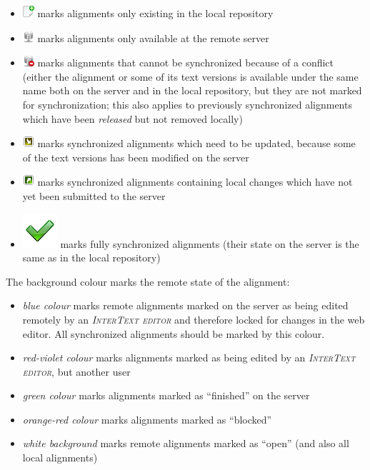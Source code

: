 \documentclass[a4paper,10pt,oneside]{book}
\newcommand{\ITeditor}{\textit{\textsc{InterText editor}}\xspace}
\begin{document}
\begin{itemize}
 \item \includegraphics[height=1.5ex]{../images/16/local.png} marks alignments only existing in the local repository
 \item \includegraphics[height=1.5ex]{../images/16/nonlocal.png} marks alignments only available at the remote server
 \item \includegraphics[height=1.5ex]{../images/16/conflicting.png} marks alignments that cannot be synchronized because of a conflict (either the alignment or some of its text versions is available under the same name both on the server and in the local repository, but they are not marked for synchronization; this also applies to previously synchronized alignments which have been \emph{released} but not removed locally)
 \item \includegraphics[height=1.5ex]{../images/16/update-required.png} marks synchronized alignments which need to be updated, because some of the text versions has been modified on the server
 \item \includegraphics[height=1.5ex]{../images/16/locally-modified.png} marks synchronized alignments containing local changes which have not yet been submitted to the server
 \item \includegraphics[height=1.5ex]{../images/48/confirmed.png} marks fully synchronized alignments (their state on the server is the same as in the local repository)
\end{itemize}

The background colour marks the remote state of the alignment:

\begin{itemize}
 \item \emph{blue colour} marks remote alignments marked on the server as being edited remotely by an \ITeditor and therefore locked for changes in the web editor. All synchronized alignments should be marked by this colour.
 \item \emph{red-violet colour} marks alignments marked as being edited by an \ITeditor, but another user
 \item \emph{green colour} marks alignments marked as ``finished'' on the server
 \item \emph{orange-red colour} marks alignments marked as ``blocked''
 \item \emph{white background} marks remote alignments marked as ``open'' (and also all local alignments)
\end{itemize}
\end{document}
